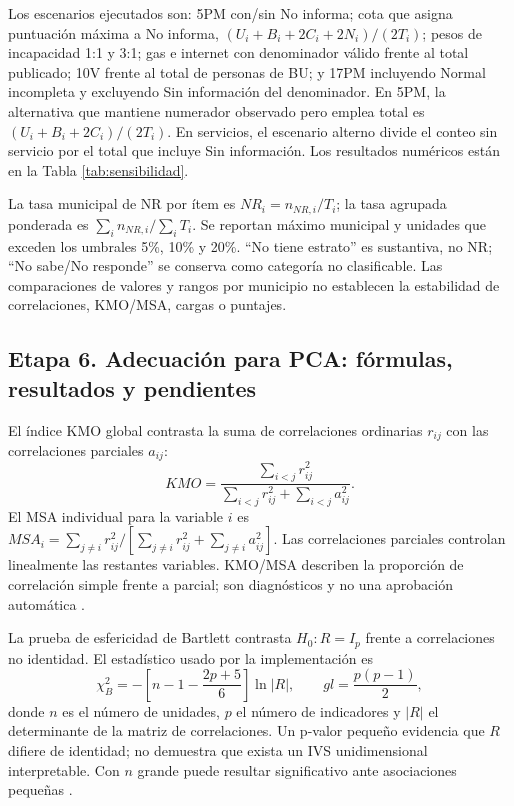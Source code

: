 Los escenarios ejecutados son: 5PM con/sin No informa; cota que asigna puntuación máxima a No informa, $(U_i+B_i+2C_i+2N_i)/(2T_i)$; pesos de incapacidad 1:1 y 3:1; gas e internet con denominador válido frente al total publicado; 10V frente al total de personas de BU; y 17PM incluyendo Normal incompleta y excluyendo Sin información del denominador. En 5PM, la alternativa que mantiene numerador observado pero emplea total es $(U_i+B_i+2C_i)/(2T_i)$. En servicios, el escenario alterno divide el conteo sin servicio por el total que incluye Sin información. Los resultados numéricos están en la Tabla \ref{tab:sensibilidad}.

La tasa municipal de NR por ítem es $NR_i=n_{NR,i}/T_i$; la tasa agrupada ponderada es $\sum_i n_{NR,i}/\sum_i T_i$. Se reportan máximo municipal y unidades que exceden los umbrales 5\%, 10\% y 20\%. \enquote{No tiene estrato} es sustantiva, no NR; \enquote{No sabe/No responde} se conserva como categoría no clasificable. Las comparaciones de valores y rangos por municipio no establecen la estabilidad de correlaciones, KMO/MSA, cargas o puntajes.

\subsection{Etapa 6. Adecuación para PCA: fórmulas, resultados y pendientes}

El índice KMO global contrasta la suma de correlaciones ordinarias $r_{ij}$ con las correlaciones parciales $a_{ij}$:
\[
KMO=\frac{\sum_{i<j}r_{ij}^{2}}{\sum_{i<j}r_{ij}^{2}+\sum_{i<j}a_{ij}^{2}}.
\]
El MSA individual para la variable $i$ es $MSA_i=\sum_{j\ne i}r_{ij}^{2}/[\sum_{j\ne i}r_{ij}^{2}+\sum_{j\ne i}a_{ij}^{2}]$. Las correlaciones parciales controlan linealmente las restantes variables. KMO/MSA describen la proporción de correlación simple frente a parcial; son diagnósticos y no una aprobación automática \citep{kaiser1974simplicity}.

La prueba de esfericidad de Bartlett contrasta $H_0:R=I_p$ frente a correlaciones no identidad. El estadístico usado por la implementación es
\[
\chi^2_B=-\left[n-1-\frac{2p+5}{6}\right]\ln|R|,\qquad gl=\frac{p(p-1)}{2},
\]
donde $n$ es el número de unidades, $p$ el número de indicadores y $|R|$ el determinante de la matriz de correlaciones. Un p-valor pequeño evidencia que $R$ difiere de identidad; no demuestra que exista un IVS unidimensional interpretable. Con $n$ grande puede resultar significativo ante asociaciones pequeñas \citep{bartlett1950factor}.

